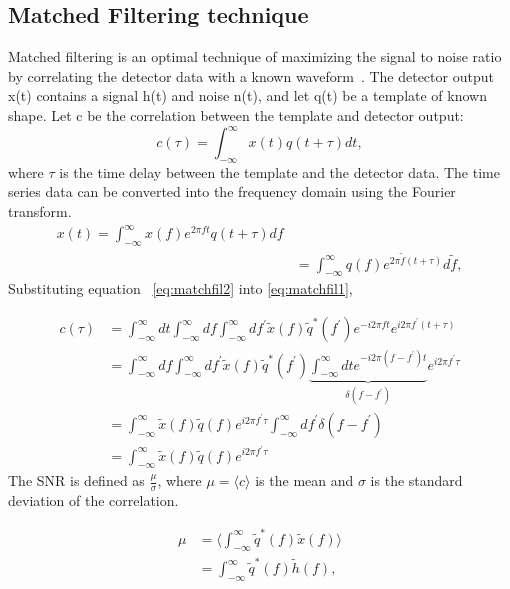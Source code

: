 \documentclass{ttuthes2007}
\begin{document}
\subsection{Matched Filtering technique}
Matched filtering is an optimal technique of maximizing the signal to noise ratio by
correlating the detector data with a known waveform~\cite{Sathyaprakash_2009}.
The detector output x(t) contains a signal h(t) and noise n(t), and let q(t) be
a template of known shape. Let c be the correlation between the template and
detector output:
\begin{equation}\label{eq:matchfil1}
c(\tau) = \int_{-\infty}^{\infty} x(t)q(t+\tau)dt,
\end{equation}
where $\tau$ is the time delay between the template and the detector data.
The time series data can be converted into the frequency domain using the Fourier
transform. 
\begin{equation}\label{eq:matchfil2}
\begin{split}
x(t)=\int_{-\infty}^{\infty} x(f)e^{2\pi f t} q(t+\tau)df\\
&=\int_{-\infty}^{\infty} q(f)e^{2\pi\tilde{f}(t+\tau)} d\tilde{f},
\end{split}
\end{equation}
Substituting equation ~\ref{eq:matchfil2} into \ref{eq:matchfil1},

\begin{align*}
c(\tau) &= \int_{-\infty}^{\infty} dt \int_{-\infty}^{\infty}
df\int_{-\infty}^{\infty} df^{'} \tilde{x}(f)\tilde{q}^*(f^{'}) e^{-i2\pi
ft}e^{i2\pi f^{'}(t+\tau)}\\
  & = \int_{-\infty}^{\infty} df \int_{-\infty}^{\infty} df^{'}
\tilde{x}(f)\tilde{q}^*(f^{'})\underbrace{\int_{-\infty}^{\infty} dt e^{-i 2\pi
(f-f^{'})t}}_{\delta(f-f^{'})}
e^{i 2\pi f^{'}\tau}\\
 & = \int_{-\infty}^{\infty}\tilde{x}(f)\tilde{q}(f)e^{i 2\pi f^{'}\tau}
\int_{-\infty}^{\infty} df^{'}\delta(f-f^{'})\\
 & = \int_{-\infty}^{\infty}\tilde{x}(f)\tilde{q}(f)e^{i 2\pi f^{'}\tau}
\end{align*}
The \ac{SNR} is defined as $\frac{\mu}{\sigma}$, where $\mu=\langle c \rangle$
is the mean and
$\sigma$ is the standard deviation of the correlation.

\begin{align*}\label{eq:sign}
\mu & = \langle\int_{-\infty}^{\infty}\tilde{q}^{*}(f)\tilde{x}(f)\rangle\\
&=\int_{-\infty}^{\infty}\tilde{q}^{*}(f)\tilde{h}(f),
\end{align*}
\end{document}
